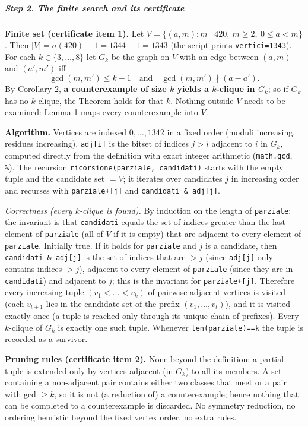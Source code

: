\documentclass[11pt,a4paper]{article}
\begin{document}
\subparagraph{Step 2. The finite search and its
certificate}\label{step-2.-the-finite-search-and-its-certificate}

\textbf{Finite set (certificate item 1).} Let
\(V=\{(a,m): m\mid 420,\ m\ge2,\ 0\le a<m\}\). Then
\(|V|=\sigma(420)-1=1344-1=1343\) (the script prints
\texttt{vertici=1343}). For each \(k\in\{3,\dots,8\}\) let \(G_k\) be
the graph on \(V\) with an edge between \((a,m)\) and \((a',m')\) iff
\[\gcd(m,m')\le k-1\quad\text{and}\quad \gcd(m,m')\nmid (a-a').\] By
Corollary 2, \textbf{a counterexample of size \(k\) yields a
\(k\)-clique in \(G_k\)}; so if \(G_k\) has no \(k\)-clique, the Theorem
holds for that \(k\). Nothing outside \(V\) needs to be examined: Lemma
1 maps every counterexample into \(V\).

\textbf{Algorithm.} Vertices are indexed \(0,\dots,1342\) in a fixed
order (moduli increasing, residues increasing). \texttt{adj{[}i{]}} is
the bitset of indices \(j>i\) adjacent to \(i\) in \(G_k\), computed
directly from the definition with exact integer arithmetic
(\texttt{math.gcd}, \texttt{\%}). The recursion
\texttt{ricorsione(parziale,\ candidati)} starts with the empty tuple
and the candidate set \(=V\); it iterates over candidates \(j\) in
increasing order and recurses with \texttt{parziale+{[}j{]}} and
\texttt{candidati\ \&\ adj{[}j{]}}.

\emph{Correctness (every \(k\)-clique is found).} By induction on the
length of \texttt{parziale}: the invariant is that \texttt{candidati}
equals the set of indices greater than the last element of
\texttt{parziale} (all of \(V\) if it is empty) that are adjacent to
every element of \texttt{parziale}. Initially true. If it holds for
\texttt{parziale} and \(j\) is a candidate, then
\texttt{candidati\ \&\ adj{[}j{]}} is the set of indices that are \(>j\)
(since \texttt{adj{[}j{]}} only contains indices \(>j\)), adjacent to
every element of \texttt{parziale} (since they are in
\texttt{candidati}) and adjacent to \(j\); this is the invariant for
\texttt{parziale+{[}j{]}}. Therefore every increasing tuple
\((v_1<\dots<v_k)\) of pairwise adjacent vertices is visited (each
\(v_{t+1}\) lies in the candidate set of the prefix
\((v_1,\dots,v_t)\)), and it is visited exactly once (a tuple is reached
only through its unique chain of prefixes). Every \(k\)-clique of
\(G_k\) is exactly one such tuple. Whenever \texttt{len(parziale)==k}
the tuple is recorded as a survivor.

\textbf{Pruning rules (certificate item 2).} None beyond the definition:
a partial tuple is extended only by vertices adjacent (in \(G_k\)) to
all its members. A set containing a non-adjacent pair contains either
two classes that meet or a pair with gcd \(\ge k\), so it is not (a
reduction of) a counterexample; hence nothing that can be completed to a
counterexample is discarded. No symmetry reduction, no ordering
heuristic beyond the fixed vertex order, no extra rules.
\end{document}
